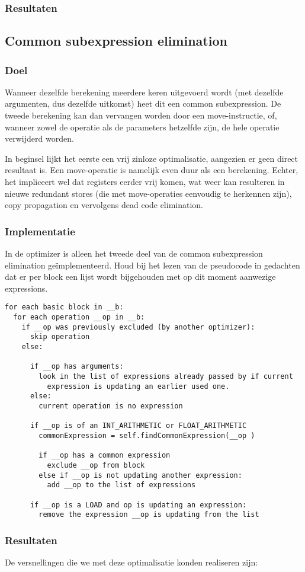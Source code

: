 \documentclass[a4paper,10pt]{article}
\begin{document}
\subsubsection{Resultaten}

\subsection{Common subexpression elimination}
\subsubsection{Doel}
Wanneer dezelfde berekening meerdere keren uitgevoerd wordt (met dezelfde
argumenten, dus dezelfde uitkomst) heet dit een common subexpression. De 
tweede berekening kan dan vervangen worden door een move-instructie, of,
wanneer zowel de operatie als de parameters hetzelfde zijn, de hele operatie
verwijderd worden.

In beginsel lijkt het eerste een vrij zinloze optimalisatie, aangezien er geen
direct resultaat is. Een move-operatie is namelijk even duur als een
berekening. Echter, het impliceert wel dat registers eerder vrij komen, wat
weer kan resulteren in nieuwe redundant stores (die met move-operaties
eenvoudig te herkennen zijn), copy propagation en vervolgens dead code
elimination.

\subsubsection{Implementatie}
In de optimizer is alleen het tweede deel van de common subexpression
elimination ge\"implementeerd. Houd bij het lezen van de pseudocode in
gedachten dat er per block een lijst wordt bijgehouden met op dit moment
aanwezige expressions.
\begin{verbatim}
for each basic block in __b:
  for each operation __op in __b:
    if __op was previously excluded (by another optimizer):
      skip operation
    else:

      if __op has arguments:
        look in the list of expressions already passed by if current
          expression is updating an earlier used one.
      else:
        current operation is no expression

      if __op is of an INT_ARITHMETIC or FLOAT_ARITHMETIC
        commonExpression = self.findCommonExpression(__op )
        
        if __op has a common expression
          exclude __op from block
        else if __op is not updating another expression:
          add __op to the list of expressions

      if __op is a LOAD and op is updating an expression:
        remove the expression __op is updating from the list
\end{verbatim}

\subsubsection{Resultaten}
De versnellingen die we met deze optimalisatie konden realiseren zijn:
\end{document}
